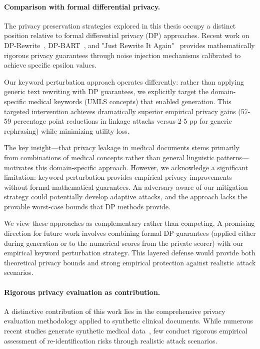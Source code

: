 \paragraph{Comparison with formal differential privacy.}

The privacy preservation strategies explored in this thesis occupy a distinct position relative to formal differential privacy (DP) approaches.
Recent work on DP-Rewrite~\cite{igamberdiev2022dprewrite}, DP-BART~\cite{igamberdiev2023dpbart}, and "Just Rewrite It Again"~\cite{igamberdiev2024rewriteagain} provides mathematically rigorous privacy guarantees through noise injection mechanisms calibrated to achieve specific epsilon values.

Our keyword perturbation approach operates differently: rather than applying generic text rewriting with DP guarantees, we explicitly target the domain-specific medical keywords (UMLS concepts) that enabled generation.
This targeted intervention achieves dramatically superior empirical privacy gains (57-59 percentage point reductions in linkage attacks versus 2-5 pp for generic rephrasing) while minimizing utility loss.

The key insight—that privacy leakage in medical documents stems primarily from combinations of medical concepts rather than general linguistic patterns—motivates this domain-specific approach.
However, we acknowledge a significant limitation: keyword perturbation provides empirical privacy improvements without formal mathematical guarantees.
An adversary aware of our mitigation strategy could potentially develop adaptive attacks, and the approach lacks the provable worst-case bounds that DP methods provide.

We view these approaches as complementary rather than competing.
A promising direction for future work involves combining formal DP guarantees (applied either during generation or to the numerical scores from the private scorer) with our empirical keyword perturbation strategy.
This layered defense would provide both theoretical privacy bounds and strong empirical protection against realistic attack scenarios.

\paragraph{Rigorous privacy evaluation as contribution.}

A distinctive contribution of this work lies in the comprehensive privacy evaluation methodology applied to synthetic clinical documents.
While numerous recent studies generate synthetic medical data~\cite{kweon_publicly_2023,xie_differentially_2024,li_synthetic_2024}, few conduct rigorous empirical assessment of re-identification risks through realistic attack scenarios.

